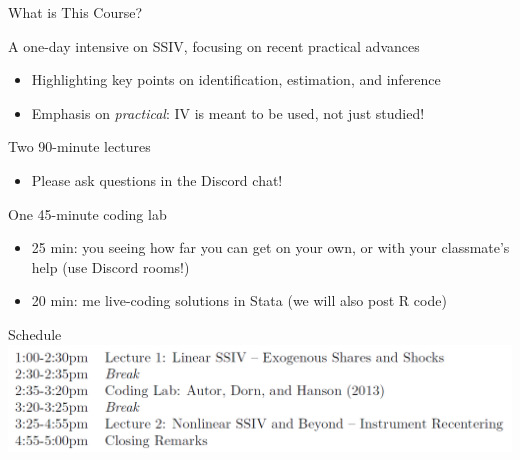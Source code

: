 \documentclass{beamer}
\begin{document}
\begin{frame}{What is This Course?}

A one-day intensive on SSIV, focusing on recent practical advances

\begin{itemize}
  \item Highlighting key points on identification, estimation, and inference
  \item Emphasis on \emph{practical}: IV is meant to be used, not just studied!
\end{itemize}\pause\medskip

Two 90-minute lectures

\begin{itemize}
  \item Please ask questions in the Discord chat!
\end{itemize}\pause\medskip

One 45-minute coding lab
\begin{itemize}
  \item 25 min: you seeing how far you can get on your own, or with your classmate's help (use Discord rooms!)
  \item 20 min: me live-coding solutions in Stata (we will also post R code)
\end{itemize}

\end{frame}

\begin{frame}{Schedule}
\includegraphics[scale=0.52]{./lecture_includes/schedule.png}
\end{frame}
\end{document}
